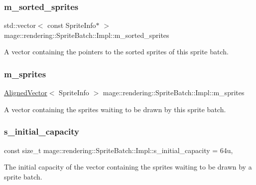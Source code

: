 \subsubsection{\texorpdfstring{m\+\_\+sorted\+\_\+sprites}{m\_sorted\_sprites}}
{\footnotesize\ttfamily std\+::vector$<$ const Sprite\+Info$\ast$ $>$ mage\+::rendering\+::\+Sprite\+Batch\+::\+Impl\+::m\+\_\+sorted\+\_\+sprites\hspace{0.3cm}{\ttfamily [private]}}

A vector containing the pointers to the sorted sprites of this sprite batch. \hypertarget{classmage_1_1rendering_1_1_sprite_batch_1_1_impl_ad8f211053433418cf5fa6c64402936b3}{}\label{classmage_1_1rendering_1_1_sprite_batch_1_1_impl_ad8f211053433418cf5fa6c64402936b3} 
\subsubsection{\texorpdfstring{m\+\_\+sprites}{m\_sprites}}
{\footnotesize\ttfamily \hyperlink{namespacemage_a8664bfb5ce2179fc64eae9f82c8a5ba8}{Aligned\+Vector}$<$ Sprite\+Info $>$ mage\+::rendering\+::\+Sprite\+Batch\+::\+Impl\+::m\+\_\+sprites\hspace{0.3cm}{\ttfamily [private]}}

A vector containing the sprites waiting to be drawn by this sprite batch. \hypertarget{classmage_1_1rendering_1_1_sprite_batch_1_1_impl_a08c5c67bb9af1c630745aba436718ff5}{}\label{classmage_1_1rendering_1_1_sprite_batch_1_1_impl_a08c5c67bb9af1c630745aba436718ff5} 
\subsubsection{\texorpdfstring{s\+\_\+initial\+\_\+capacity}{s\_initial\_capacity}}
{\footnotesize\ttfamily const size\+\_\+t mage\+::rendering\+::\+Sprite\+Batch\+::\+Impl\+::s\+\_\+initial\+\_\+capacity = 64u\hspace{0.3cm}{\ttfamily [static]}, {\ttfamily [private]}}

The initial capacity of the vector containing the sprites waiting to be drawn by a sprite batch. 